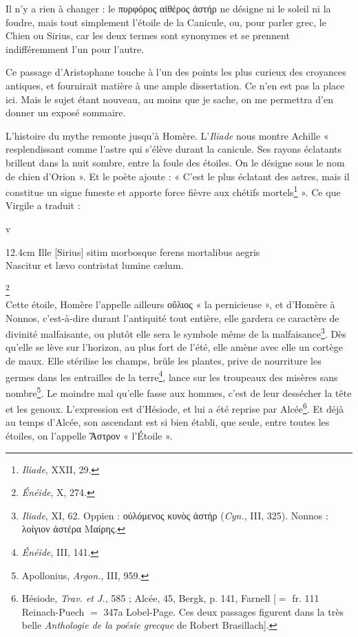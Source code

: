 \documentclass{book}%
\newcommand{\italique}[1]{\textit{#1}}%
\newcommand{\espace}[1]{\hspace{#1}}%
\newcommand{\fantome}{{\color{white}v}}
\newcommand{\note}[1]{\footnote{#1}}
\newcommand{\citComm}[1]{\fantome\\
\espace{1cm}\begin{minipagewithmarginpars}{12.4cm}%
#1
\end{minipagewithmarginpars}%
}
\begin{document}
Il n'y a rien à changer : le πυρφόρος αἰθέρος ἀστήρ ne désigne ni le soleil ni la foudre, mais tout simplement l'étoile de la Canicule, ou, pour parler grec, le Chien ou Sirius, car les deux termes sont synonymes et se prennent indifféremment l'un pour l'autre. 

Ce passage d'Aristophane touche à l'un des points les plus curieux des croyances antiques, et fournirait matière à une ample dissertation. Ce n'en est pas la place ici. Mais le sujet étant nouveau, au moins que je sache, on me permettra d'en donner un exposé sommaire.

L'histoire du mythe remonte jusqu'à Homère. L'\italique{Iliade} nous montre Achille « resplendissant comme l'astre qui s'élève durant la canicule. Ses rayons éclatants brillent dans la nuit sombre, entre la foule des étoiles. On le désigne sous le nom de chien d'Orion ». Et le poète ajoute : « C'est le plus éclatant des astres, mais il constitue un signe funeste et apporte force fièvre aux chétifs mortels\note{\italique{Iliade}, XXII, 29.} ». Ce que Virgile a traduit : 

\citComm{Ille [Sirius] sitim morbosque ferens mortalibus aegris\\
Nascitur et lævo contristat lumine cælum.}\note{\italique{Énéide}, X, 274.}\\ 

Cette étoile, Homère l'appelle ailleurs οὔλιος « la pernicieuse », et d'Homère à Nonnos, c'est-à-dire durant l'antiquité tout entière, elle gardera ce caractère de divinité malfaisante, ou plutôt elle sera le symbole même de la malfaisance\note{\italique{Iliade}, XI, 62. Oppien : οὐλόμενος κυνὸς ἀστήρ (\italique{Cyn.}, III, 325). Nonnos : λοίγιον ἀστέρα Μαίρης.}. 
Dès qu'elle se lève sur l'horizon, au plus fort de l'été, elle amène avec elle un cortège de maux. Elle stérilise les champs, brûle les plantes, prive de nourriture les germes dans les entrailles de la terre\note{\italique{Énéide}, III, 141.}, lance sur les troupeaux des misères sans nombre\note{Apollonius, \italique{Argon.}, III, 959.}. Le moindre mal qu'elle fasse aux hommes, c'est de leur dessécher la tête et les genoux. L'expression est d'Hésiode, et lui a été reprise par Alcée\note{Hésiode, \italique{Trav. et J.}, 585 ; Alcée, 45, Bergk, p. 141, Farnell [$=$ fr. 111 Reinach-Puech $=$ 347a Lobel-Page. Ces deux passages figurent dans la très belle \italique{Anthologie de la poésie grecque} de Robert Brasillach].}. Et déjà au temps d'Alcée, son ascendant est si bien établi, que seule, entre toutes les étoiles, on l'appelle Ἄστρον « l'Étoile ».
\end{document}
